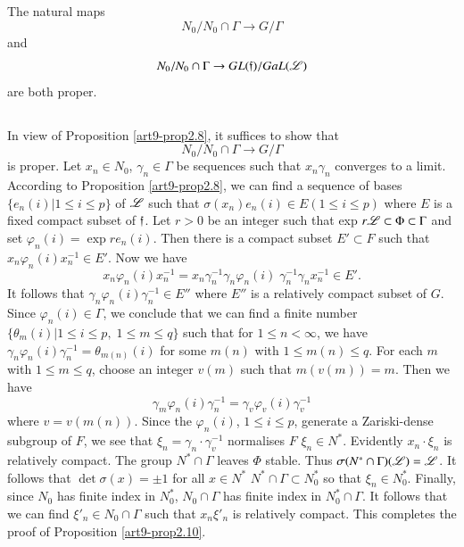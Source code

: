 \setcounter{definition}{9}
\begin{proposition}\label{art9-prop2.10}
The natural maps 
$$
N_0 / N_0 \cap \Gamma \to G / \Gamma
$$
and 
$$
N_0 / N_0 \cap \Gamma \to G L (\mathfrak{f}) /  Ga L (\mathscr{L})
$$
are both proper.
\end{proposition}

\setcounter{subsection}{10}
\subsection{}\label{art9-subsec2.11}
In view of Proposition \ref{art9-prop2.8}, it suffices to show that
$$
N_0/ N_0 \cap \Gamma \to G / \Gamma
$$
is proper. Let $x_n \in N_0$, $\gamma_n \in \Gamma$ be sequences such that $x_n \gamma_n$ converges to a limit. According to Proposition \ref{art9-prop2.8}, we can find a sequence of bases $\{e_n(i) \big| 1 \leqslant i \leqslant p \}$ of $\mathscr{L}$ such that $\sigma (x_n) e_n (i) \in E (1 \leqslant i \leqslant p)$ where $E$ is a fixed compact subset of $\mathfrak{f}$. Let $r > 0$ be an integer such that exp $r \mathscr{L} \subset \Phi \subset \Gamma$ and set $\varphi_n (i) =\exp r e_n (i)$. Then there is a compact subset $E' \subset F$ such that $x_n \varphi_n (i) x^{-1}_n \in E'$. Now we have
$$
x_n \varphi_n (i) x^{-1}_n = x_n \gamma^{-1}_n \gamma_n \varphi_n (i) \; \gamma^{-1}_n \gamma_n x^{-1}_n \in E'.
$$
It follows that $\gamma_n \varphi_n(i) \gamma^{-1}_n \in E''$ where $E''$ is a relatively compact subset of $G$. Since $\varphi_n(i) \in \Gamma$, we conclude that we can find a finite number $\{\theta_m (i) \big| 1 \leqslant i \leqslant p, \; 1 \leqslant m \leqslant q\}$ such that for $1 \leqslant n < \infty$, we have $\gamma_n \varphi_n(i) \gamma^{-1}_n = \theta_{m(n)} (i)$ for some $m(n)$ with $1 \leqslant m (n) \leqslant q$. For each $m$ with $1 \leqslant m \leqslant q$, choose an integer $v(m)$ such that $m(v(m)) = m$. Then we have
$$
\gamma_m \varphi_n (i) \gamma^{-1}_n = \gamma_v \varphi_v (i) \gamma^{-1}_v
$$
where $v = v (m(n))$. Since the $\varphi_n (i)$, $1 \leqslant i \leqslant p$, generate a Zariski-dense subgroup of $F$, we see that $\xi_n = \gamma_n \cdot \gamma^{-1}_v$ normalises $F$ \ie $\xi_n \in N^\ast$. Evidently $x_n \cdot \xi_n$ is relatively compact. The group $N^\ast \cap \Gamma$ leaves $\Phi$ stable. Thus $\sigma (N^\ast \cap \Gamma) (\mathscr{L}) = \mathscr{L}$. It follows that $\det \sigma (x) = \pm 1$ for all  $x \in N^\ast$ \ie $N^\ast \cap \Gamma \subset N^\ast_0$  so that $\xi_n \in N^\ast_0$. Finally, since $N_0$ has finite index in $N^\ast_0$, $N_0 \cap \Gamma$ has finite index in $N^\ast_0 \cap \Gamma$. It follows that we can find $\xi'_n \in N_0 \cap \Gamma$ such that $x_n \xi'_n$ is relatively compact. This completes the proof of Proposition \ref{art9-prop2.10}.

